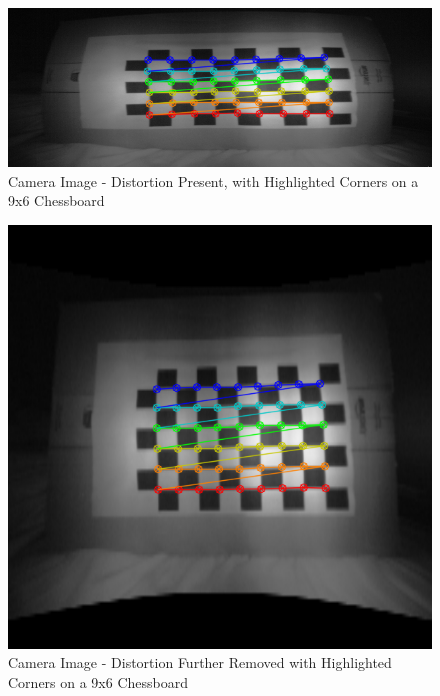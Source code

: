 \documentclass[11pt,oneside]{report}
\begin{document}
		\begin{figure}
			\centering
    				\includegraphics[width=\textwidth]{4}
    				\caption{Camera Image - Distortion Present, with Highlighted Corners on a 9x6 Chessboard\protect {\label{fig:image_4}}}
    			
		\end{figure}	
		\begin{figure}
			\centering
    				\includegraphics[scale=0.5]{5}
    				\caption{Camera Image - Distortion Further Removed with Highlighted Corners on a 9x6 Chessboard\protect {\label{fig:image_5}}}
    			
		\end{figure}	
		\clearpage
\end{document}
